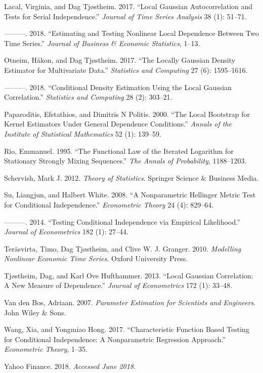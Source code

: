 \documentclass[
  12pt,
  letterpaper]{article}
\numberwithin{equation}{section}
\begin{document}
\leavevmode\hypertarget{ref-lacal2017local}{}%
Lacal, Virginia, and Dag Tjøstheim. 2017. ``Local Gaussian Autocorrelation and Tests for Serial Independence.'' \emph{Journal of Time Series Analysis} 38 (1): 51--71.

\leavevmode\hypertarget{ref-lacal2018estimating}{}%
---------. 2018. ``Estimating and Testing Nonlinear Local Dependence Between Two Time Series.'' \emph{Journal of Business \& Economic Statistics}, 1--13.

\leavevmode\hypertarget{ref-otneim2017locally}{}%
Otneim, Håkon, and Dag Tjøstheim. 2017. ``The Locally Gaussian Density Estimator for Multivariate Data.'' \emph{Statistics and Computing} 27 (6): 1595--1616.

\leavevmode\hypertarget{ref-otneim2017conditional}{}%
---------. 2018. ``Conditional Density Estimation Using the Local Gaussian Correlation.'' \emph{Statistics and Computing} 28 (2): 303--21.

\leavevmode\hypertarget{ref-paparoditis2000local}{}%
Paparoditis, Efstathios, and Dimitris N Politis. 2000. ``The Local Bootstrap for Kernel Estimators Under General Dependence Conditions.'' \emph{Annals of the Institute of Statistical Mathematics} 52 (1): 139--59.

\leavevmode\hypertarget{ref-rio1995functional}{}%
Rio, Emmanuel. 1995. ``The Functional Law of the Iterated Logarithm for Stationary Strongly Mixing Sequences.'' \emph{The Annals of Probability}, 1188--1203.

\leavevmode\hypertarget{ref-schervish1995theory}{}%
Schervish, Mark J. 2012. \emph{Theory of Statistics}. Springer Science \& Business Media.

\leavevmode\hypertarget{ref-su2008nonparametric}{}%
Su, Liangjun, and Halbert White. 2008. ``A Nonparametric Hellinger Metric Test for Conditional Independence.'' \emph{Econometric Theory} 24 (4): 829--64.

\leavevmode\hypertarget{ref-su2014testing}{}%
---------. 2014. ``Testing Conditional Independence via Empirical Likelihood.'' \emph{Journal of Econometrics} 182 (1): 27--44.

\leavevmode\hypertarget{ref-terasvirta2010modelling}{}%
Teräsvirta, Timo, Dag Tjøstheim, and Clive W. J. Granger. 2010. \emph{Modelling Nonlinear Economic Time Series}. Oxford University Press.

\leavevmode\hypertarget{ref-tjostheim2013local}{}%
Tjøstheim, Dag, and Karl Ove Hufthammer. 2013. ``Local Gaussian Correlation: A New Measure of Dependence.'' \emph{Journal of Econometrics} 172 (1): 33--48.

\leavevmode\hypertarget{ref-van2007parameter}{}%
Van den Bos, Adriaan. 2007. \emph{Parameter Estimation for Scientists and Engineers}. John Wiley \& Sons.

\leavevmode\hypertarget{ref-wang2017characteristic}{}%
Wang, Xia, and Yongmiao Hong. 2017. ``Characteristic Function Based Testing for Conditional Independence: A Nonparametric Regression Approach.'' \emph{Econometric Theory}, 1--35.

\leavevmode\hypertarget{ref-yahoo}{}%
Yahoo Finance. 2018. \emph{Accessed June 2018}.
\end{document}
